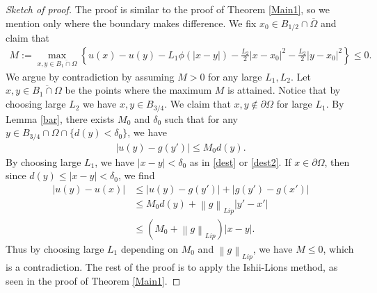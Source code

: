\documentclass[10pt,a4paper]{amsart}
\newcommand{\norm}[1]{\left\lVert#1\right\rVert}
\begin{document}
\begin{proof}[Sketch of proof]
    The proof is similar to the proof of Theorem \ref{Main1}, so we mention only where the boundary makes difference.
    We fix $x_0 \in B_{1/2} \cap \overline{\Omega}$ and claim that
    \begin{align*}
        M:= \max_{x,y\in \overline{B_1\cap \Omega}}  \left\{ u(x) - u(y) - L_1\phi(|x-y|) - \frac{L_2}{2}|x-x_0|^2 -\frac{L_2}{2}|y-x_0|^2 \right\} \leq 0.
    \end{align*}
    We argue by contradiction by assuming $M>0$ for any large $L_1, L_2$.
    Let $x,y \in \overline{B_1\cap \Omega}$ be the points where the maximum $M$ is attained.
    Notice that by choosing large $L_2$ we have $x,y \in B_{3/4} $.
    We claim that $x,y \notin \partial \Omega$ for large $L_1$.
    By Lemma \ref{bar}, there exists $M_0$ and $\delta_0$ such that for any $y \in B_{3/4} \cap \Omega \cap \{d(y)<\delta_0\}$, we have
    \begin{align*}
        |u(y)-g(y')| \leq M_0d(y).
    \end{align*}
    By choosing large $L_1$, we have $|x-y| <\delta_0$ as in \eqref{dest} or \eqref{dest2}. If $x \in \partial\Omega$, then since $d(y) \leq |x-y|<\delta_0$, we find
    \begin{align*}
        |u(y)-u(x)| &\leq |u(y)-g(y')| + |g(y')-g(x')| \\
        &\leq M_0d(y) + \norm{g}_{Lip}|y'-x'|\\
        &\leq (M_0 + \norm{g}_{Lip})|x-y|.
    \end{align*}
    Thus by choosing large $L_1$ depending on $M_0$ and $\norm{g}_{Lip}$, we have $M\leq0$, which is a contradiction.
    The rest of the proof is to apply the Ishii-Lions method, as seen in the proof of Theorem \ref{Main1}.
\end{proof}
\end{document}
